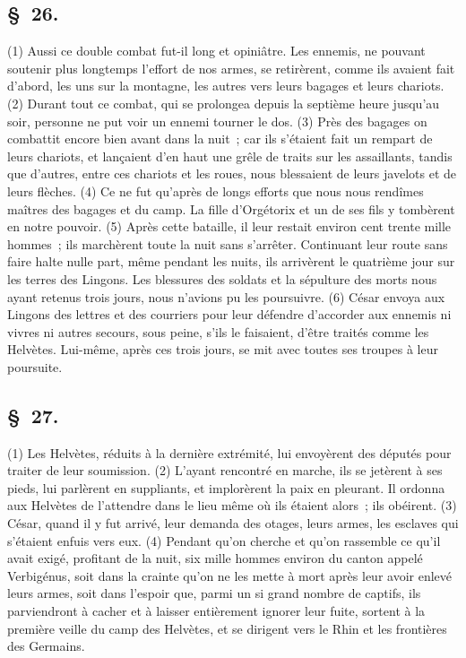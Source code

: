 \documentclass[french,twoside]{book} %
\begin{document}
\subsection[{§ 26.}]{ \textsc{§ 26.} }
\noindent (1) Aussi ce double combat fut-il long et opiniâtre. Les ennemis, ne pouvant soutenir plus longtemps l’effort de nos armes, se retirèrent, comme ils avaient fait d’abord, les uns sur la montagne, les autres vers leurs bagages et leurs chariots. (2) Durant tout ce combat, qui se prolongea depuis la septième heure jusqu’au soir, personne ne put voir un ennemi tourner le dos. (3) Près des bagages on combattit encore bien avant dans la nuit ; car ils s’étaient fait un rempart de leurs chariots, et lançaient d’en haut une grêle de traits sur les assaillants, tandis que d’autres, entre ces chariots et les roues, nous blessaient de leurs javelots et de leurs flèches. (4) Ce ne fut qu’après de longs efforts que nous nous rendîmes maîtres des bagages et du camp. La fille d’Orgétorix et un de ses fils y tombèrent en notre pouvoir. (5) Après cette bataille, il leur restait environ cent trente mille hommes ; ils marchèrent toute la nuit sans s’arrêter. Continuant leur route sans faire halte nulle part, même pendant les nuits, ils arrivèrent le quatrième jour sur les terres des Lingons. Les blessures des soldats et la sépulture des morts nous ayant retenus trois jours, nous n’avions pu les poursuivre. (6) César envoya aux Lingons des lettres et des courriers pour leur défendre d’accorder aux ennemis ni vivres ni autres secours, sous peine, s’ils le faisaient, d’être traités comme les Helvètes. Lui-même, après ces trois jours, se mit avec toutes ses troupes à leur poursuite.
\subsection[{§ 27.}]{ \textsc{§ 27.} }
\noindent (1) Les Helvètes, réduits à la dernière extrémité, lui envoyèrent des députés pour traiter de leur soumission. (2) L'ayant rencontré en marche, ils se jetèrent à ses pieds, lui parlèrent en suppliants, et implorèrent la paix en pleurant. Il ordonna aux Helvètes de l’attendre dans le lieu même où ils étaient alors ; ils obéirent. (3) César, quand il y fut arrivé, leur demanda des otages, leurs armes, les esclaves qui s’étaient enfuis vers eux. (4) Pendant qu’on cherche et qu’on rassemble ce qu’il avait exigé, profitant de la nuit, six mille hommes environ du canton appelé Verbigénus, soit dans la crainte qu’on ne les mette à mort après leur avoir enlevé leurs armes, soit dans l’espoir que, parmi un si grand nombre de captifs, ils parviendront à cacher et à laisser entièrement ignorer leur fuite, sortent à la première veille du camp des Helvètes, et se dirigent vers le Rhin et les frontières des Germains.
\end{document}
